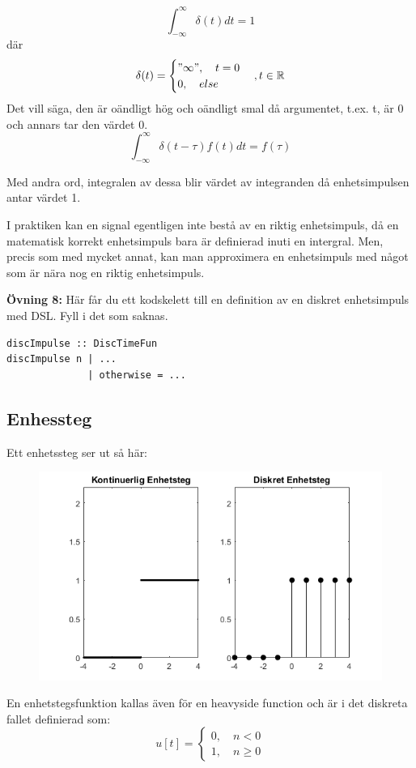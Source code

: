 \documentclass{article}
\begin{document}
$$\int_{-\infty}^{\infty} \delta(t) dt = 1 $$
där
$$
\delta(t)=
\begin{cases}
"\infty",\quad t = 0 \\
0, \quad else
\end{cases}, t\in \mathbb{R}
$$
Det vill säga, den är oändligt hög och oändligt smal då argumentet,
t.ex. t, är 0 och annars tar den värdet 0.
$$\int_{-\infty}^{\infty} \delta(t-\tau) f(t) dt = f(\tau) $$

Med andra ord, integralen av dessa blir värdet av integranden då
enhetsimpulsen antar värdet 1.

I praktiken kan en signal egentligen inte bestå av en riktig enhetsimpuls,
då en matematisk korrekt enhetsimpuls bara är definierad inuti en intergral.
Men, precis som med mycket annat, kan man approximera en enhetsimpuls med något
som är nära nog en riktig enhetsimpuls.

\textbf{Övning 8:} Här får du ett kodskelett till en definition av en diskret
enhetsimpuls med DSL. Fyll i det som saknas.
\begin{verbatim}
discImpulse :: DiscTimeFun
discImpulse n | ...
              | otherwise = ...
\end{verbatim}

\subsection{Enhessteg}
Ett enhetssteg ser ut så här:

\begin{figure}[h]
\centerline{\includegraphics[scale=0.50]{heavy.png}}
\caption{}
\label{}
\end{figure}

En enhetstegsfunktion kallas även för en heavyside function och är i det
diskreta fallet definierad som:
$$
u[t] =
\begin{cases}
0, \quad n < 0 \\
1, \quad n \geq 0
\end{cases}
$$
\end{document}
